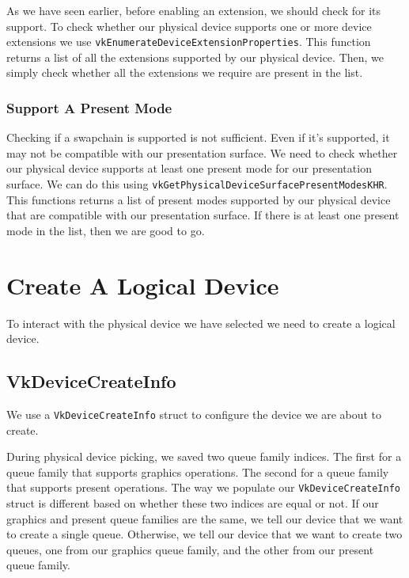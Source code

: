 As we have seen earlier, before enabling an extension, we should check for its
support.
To check whether our physical device supports one or more device extensions we use
\texttt{vkEnumerateDeviceExtensionProperties}.
This function returns a list of all the extensions supported by our physical device.
Then, we simply check whether all the extensions we require are present in the list.

\subsubsection{Support A Present Mode}

Checking if a swapchain is supported is not sufficient.
Even if it's supported, it may not be compatible with our presentation surface.
We need to check whether our physical device supports at least one present mode
for our presentation surface.
We can do this using \texttt{vkGetPhysicalDeviceSurfacePresentModesKHR}.
This functions returns a list of present modes supported by our physical device
that are compatible with our presentation surface.
If there is at least one present mode in the list, then we are good to go.

\section{Create A Logical Device}

To interact with the physical device we have selected we need to create
a logical device.

\begin{minipage}{\linewidth}{\noindent}
    
\end{minipage}

\subsection{VkDeviceCreateInfo}

We use a \texttt{VkDeviceCreateInfo} struct to configure the device we are about to
create.

During physical device picking, we saved two queue family indices.
The first for a queue family that supports graphics operations.
The second for a queue family that supports present operations.
The way we populate our \texttt{VkDeviceCreateInfo} struct is different based on whether
these two indices are equal or not.
If our graphics and present queue families are the same, we tell our device that
we want to create a single queue.
Otherwise, we tell our device that we want to create two queues, one from our
graphics queue family, and the other from our present queue family.

